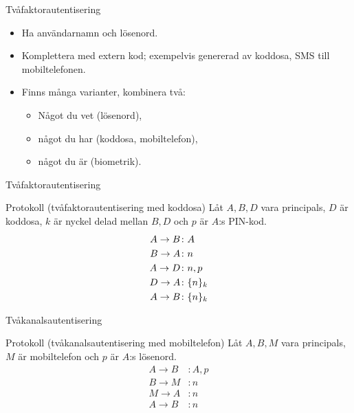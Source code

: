 \begin{frame}{Tvåfaktorautentisering}
  \begin{itemize}
    \item Ha användarnamn och lösenord.
    \item Komplettera med extern kod; exempelvis genererad av koddosa, SMS till 
      mobiltelefonen.
    \item Finns många varianter, kombinera två:
      \begin{itemize}
        \item Något du vet (lösenord),
        \item något du har (koddosa, mobiltelefon),
        \item något du är (biometrik).
      \end{itemize}
  \end{itemize}
\end{frame}

\begin{frame}{Tvåfaktorautentisering}
  \begin{block}{Protokoll (tvåfaktorautentisering med koddosa)}
    Låt \(A, B, D\) vara principals, \(D\) är koddosa, \(k\) är nyckel delad 
    mellan \(B, D\) och \(p\) är \(A\):s PIN-kod.
    \begin{align*}
      A\to B &\colon A \\
      B\to A &\colon n \\
      A\to D &\colon n, p \\
      D\to A &\colon \{n\}_{k} \\
      A\to B &\colon \{n\}_{k}
    \end{align*}
  \end{block}
\end{frame}

\begin{frame}{Tvåkanalsautentisering}
  \begin{block}{Protokoll (tvåkanalsautentisering med mobiltelefon)}
    Låt \(A, B, M\) vara principals, \(M\) är mobiltelefon och \(p\) är \(A\):s 
    lösenord.
    \begin{align*}
      A\to B &\colon A, p \\
      B\to M &\colon n \\
      M\to A &\colon n \\
      A\to B &\colon n
    \end{align*}
  \end{block}
\end{frame}

